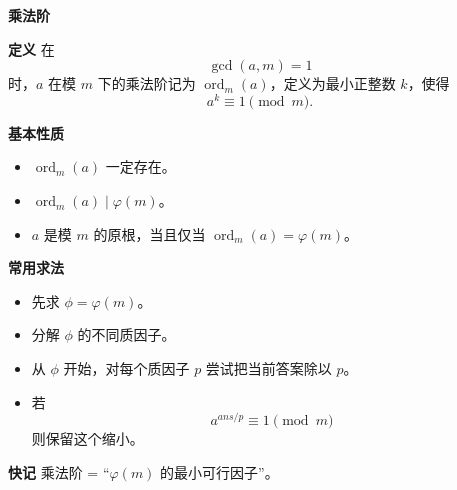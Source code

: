 \textbf{乘法阶}

\textbf{定义}
在
\[
\gcd(a,m)=1
\]
时，$a$ 在模 $m$ 下的乘法阶记为 $\operatorname{ord}_m(a)$，定义为最小正整数 $k$，使得
\[
a^k\equiv 1\pmod m.
\]

\textbf{基本性质}
\begin{itemize}
\item $\operatorname{ord}_m(a)$ 一定存在。
\item $\operatorname{ord}_m(a)\mid \varphi(m)$。
\item $a$ 是模 $m$ 的原根，当且仅当 $\operatorname{ord}_m(a)=\varphi(m)$。
\end{itemize}

\textbf{常用求法}
\begin{itemize}
\item 先求 $\phi=\varphi(m)$。
\item 分解 $\phi$ 的不同质因子。
\item 从 $\phi$ 开始，对每个质因子 $p$ 尝试把当前答案除以 $p$。
\item 若
\[
a^{ans/p}\equiv 1\pmod m
\]
则保留这个缩小。
\end{itemize}

\textbf{快记}
乘法阶 = “$\varphi(m)$ 的最小可行因子”。
